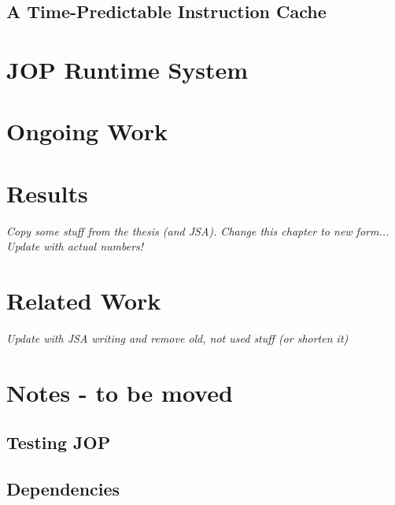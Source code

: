 \clearpage
    
\clearpage
    

\clearpage
    \section{A Time-Predictable Instruction Cache}
    \label{sec:cache}
    

\chapter{JOP Runtime System}
\label{chap:runtime}

    
    
    
    
    
    \label{sec:gc}
    

\chapter{Ongoing Work}
\label{chap:ongoing}
    

\chapter{Results}
\emph{Copy some stuff from the thesis (and JSA). Change this chapter
to new form... Update with actual numbers!}

\label{chap:results}
    

\chapter{Related Work}
\label{chap:related}

\emph{Update with JSA writing and remove old, not used stuff (or
shorten it)}
    


\chapter{Notes - to be moved}

\section{Testing JOP}



\section{Dependencies}

